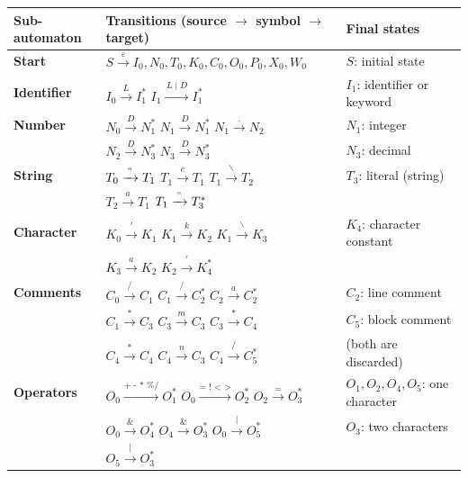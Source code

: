 \documentclass[12pt,letterpaper]{article}
\begin{document}
{\small
\noindent
{}
\begin{tabularx}{\textwidth}{@{} >{\bfseries}p{2.8cm} X p{5.5cm} @{}}
\rowcolor{tableheader}
\textbf{Sub-automaton} & \textbf{Transitions (source $\rightarrow$ symbol $\rightarrow$ target)} & \textbf{Final states} \\ 
\toprule

Start & $S \xrightarrow{\,\varepsilon\,} I_0, N_0, T_0, K_0, C_0, O_0, P_0, X_0, W_0$ & $S$: initial state \\

Identifier & $I_0 \xrightarrow{\,L\,} I_1^*$ \quad $I_1 \xrightarrow{\,L \mid D\,} I_1^*$ & $I_1$: identifier or keyword \\

Number & $N_0 \xrightarrow{\,D\,} N_1^*$ \quad $N_1 \xrightarrow{\,D\,} N_1^*$ \quad $N_1 \xrightarrow{\,.\,} N_2$ & $N_1$: integer \\
& $N_2 \xrightarrow{\,D\,} N_3^*$ \quad $N_3 \xrightarrow{\,D\,} N_3^*$ & $N_3$: decimal \\

String & $T_0 \xrightarrow{\,"\,} T_1$ \quad $T_1 \xrightarrow{\,c\,} T_1$ \quad $T_1 \xrightarrow{\,\backslash\,} T_2$ & $T_3$: literal (string) \\
& $T_2 \xrightarrow{\,a\,} T_1$ \quad $T_1 \xrightarrow{\,"\,} T_3^*$ & \\

Character & $K_0 \xrightarrow{\,'\,} K_1$ \quad $K_1 \xrightarrow{\,k\,} K_2$ \quad $K_1 \xrightarrow{\,\backslash\,} K_3$ & $K_4$: character constant \\
& $K_3 \xrightarrow{\,a\,} K_2$ \quad $K_2 \xrightarrow{\,'\,} K_4^*$ & \\

Comments & $C_0 \xrightarrow{\,/\,} C_1$ \quad $C_1 \xrightarrow{\,/\,} C_2^*$ \quad $C_2 \xrightarrow{\,a\,} C_2^*$ & $C_2$: line comment \\
& $C_1 \xrightarrow{\,*\,} C_3$ \quad $C_3 \xrightarrow{\,m\,} C_3$ \quad $C_3 \xrightarrow{\,*\,} C_4$ & $C_5$: block comment \\
& $C_4 \xrightarrow{\,*\,} C_4$ \quad $C_4 \xrightarrow{\,n\,} C_3$ \quad $C_4 \xrightarrow{\,/\,} C_5^*$ & (both are discarded) \\

Operators & $O_0 \xrightarrow{\text{+ - * \% /}} O_1^*$ \quad $O_0 \xrightarrow{\text{= ! < >}} O_2^*$ \quad $O_2 \xrightarrow{\text{=}} O_3^*$ & $O_1, O_2, O_4, O_5$: one character \\
& $O_0 \xrightarrow{\text{\&}} O_4^*$ \quad $O_4 \xrightarrow{\text{\&}} O_3^*$ \quad $O_0 \xrightarrow{\text{|}} O_5^*$ & $O_3$: two characters \\
& $O_5 \xrightarrow{\text{|}} O_3^*$ & \\


\end{tabularx}}
\end{document}
